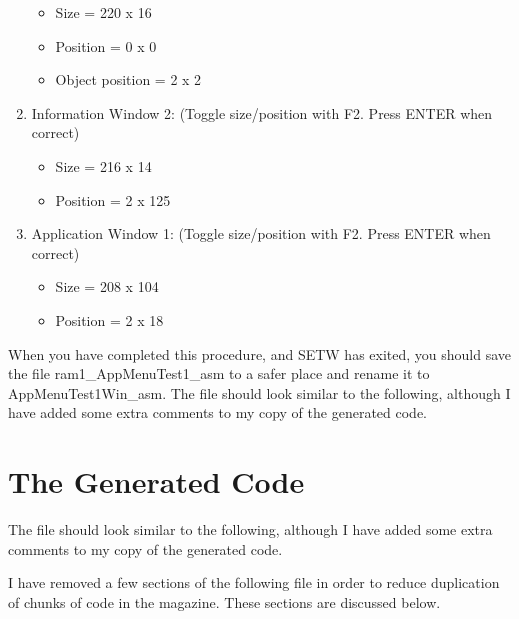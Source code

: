 \begin{enumerate}
{\begin{itemize}[itemsep=0pt]
\item{}Size = 220 x 16


\item{}Position = 0 x 0


\item{}Object position = 2 x 2

\end{itemize}
}
\item{Information Window 2: (Toggle size/position with F2. Press ENTER
        when correct)
\begin{itemize}[itemsep=0pt]

\item{}Size = 216 x 14


\item{}Position = 2 x 125

\end{itemize}
}
\item{Application Window 1: (Toggle size/position with F2. Press ENTER
        when correct)
\begin{itemize}[itemsep=0pt]

\item{}Size = 208 x 104


\item{}Position = 2 x 18

\end{itemize}
}
\end{enumerate}

When you have completed this procedure, and
 SETW has exited, you should save the file
 ram1\_AppMenuTest1\_asm to a safer place and rename it
    to AppMenuTest1Win\_asm. The file should look similar
    to the following, although I have added some extra comments to my copy of
    the generated code.

\section{The Generated Code}
\label{ch29-app-menu-code}%

The file should look similar to the following, although I have added
    some extra comments to my copy of the generated code.

\begin{note}
I have removed a few sections of the following file in order to
      reduce duplication of chunks of code in the magazine. These sections are
      discussed below.
\end{note}

